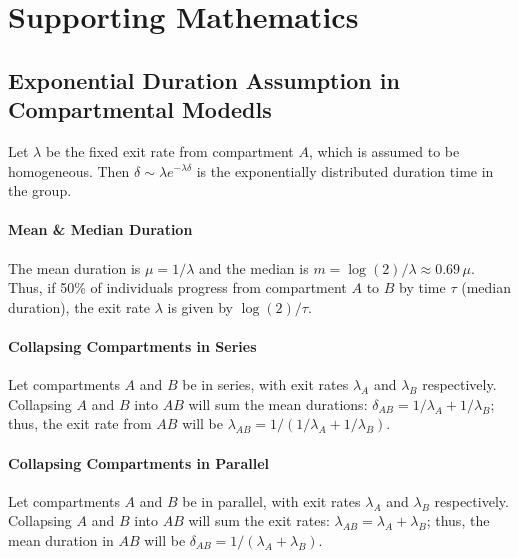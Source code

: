 \section{Supporting Mathematics}\label{app.model.math}
\subsection{Exponential Duration Assumption in Compartmental Modedls}\label{app.model.math.exp}
Let $\lambda$ be the fixed exit rate from compartment $A$, which is assumed to be homogeneous.
Then $\delta \sim \lambda e^{-\lambda \delta}$ is %
the exponentially distributed duration time in the group.
\paragraph{Mean \& Median Duration}
The mean duration is $\mu = 1/\lambda$ and the median is $m = \log(2)/\lambda \approx 0.69\,\mu$.
Thus, if 50\% of individuals progress from compartment $A$ to $B$ by time $\tau$ (median duration),
the exit rate $\lambda$ is given by $\log(2)/\tau$.
\paragraph{Collapsing Compartments in Series}
Let compartments $A$ and $B$ be in series, with exit rates $\lambda_A$ and $\lambda_B$ respectively.
Collapsing $A$ and $B$ into $AB$ will sum the mean durations: $\delta_{AB} = 1/\lambda_A + 1/\lambda_B$;
thus, the exit rate from $AB$ will be $\lambda_{AB} = 1/(1/\lambda_A + 1/\lambda_B)$.
\paragraph{Collapsing Compartments in Parallel}
Let compartments $A$ and $B$ be in parallel, with exit rates $\lambda_A$ and $\lambda_B$ respectively.
Collapsing $A$ and $B$ into $AB$ will sum the exit rates: $\lambda_{AB} = \lambda_A + \lambda_B$;
thus, the mean duration in $AB$ will be $\delta_{AB} = 1/(\lambda_A + \lambda_B)$.
